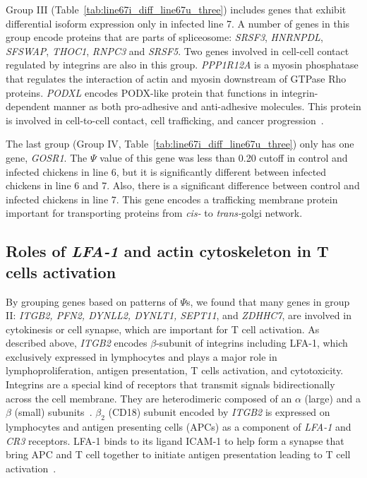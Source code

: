 \documentclass[10pt]{article}
\begin{document}
Group III (Table~\ref{tab:line67i_diff_line67u_three}) includes genes that
exhibit differential isoform expression only in infected line 7.  A number of
genes in this group encode proteins that are parts of spliceosome: {\em SRSF3},
{\em HNRNPDL}, {\em SFSWAP}, {\em THOC1}, {\em RNPC3} and {\em SRSF5}.  Two
genes involved in cell-cell contact regulated by integrins are also in this
group.  {\em PPP1R12A} is a myosin phosphatase that regulates the interaction of
actin and myosin downstream of GTPase Rho proteins.  {\em PODXL} encodes
PODX-like protein that functions in integrin-dependent manner as both
pro-adhesive and anti-adhesive molecules.  This protein is involved in
cell-to-cell contact, cell trafficking, and cancer
progression~\cite{nielsen2009role,somasiri2004overexpression}.

The last group (Group IV, Table~\ref{tab:line67i_diff_line67u_three}) only has
one gene, {\em GOSR1}.  The $\Psi$ value of this gene was less than 0.20 cutoff
in control and infected chickens in line 6, but it is significantly different
between infected chickens in line 6 and 7.  Also, there is a significant
difference between control and infected chickens in line 7.  This gene encodes a
trafficking membrane protein important for transporting proteins from {\em cis-}
to {\em trans-}golgi network.

\subsection*{Roles of {\em LFA-1} and actin cytoskeleton in T cells
activation}

By grouping genes based on patterns of $\Psi$s, we found that many genes in
group II: {\em ITGB2, PFN2, DYNLL2, DYNLT1, SEPT11}, and {\em ZDHHC7}, are
involved in cytokinesis or cell synapse, which are important for T cell
activation.  As described above, {\em ITGB2} encodes $\beta$-subunit of
integrins including LFA-1, which exclusively expressed in lymphocytes and plays
a major role in lymphoproliferation, antigen presentation, T cells activation,
and cytotoxicity.  Integrins are a special kind of receptors that transmit
signals bidirectionally across the cell membrane.  They are heterodimeric
composed of an $\alpha$ (large) and a $\beta$ (small)
subunits~\cite{wang2010immunopathologies}.  $\beta_{2}$ (CD18) subunit encoded
by {\em ITGB2} is expressed on lymphocytes and antigen presenting cells (APCs)
as a component of {\em LFA-1} and {\em CR3} receptors.  LFA-1 binds to its
ligand ICAM-1 to help form a synapse that bring APC and T cell together to
initiate antigen presentation leading to T cell
activation~\cite{dustin2000immunological}.
\end{document}
